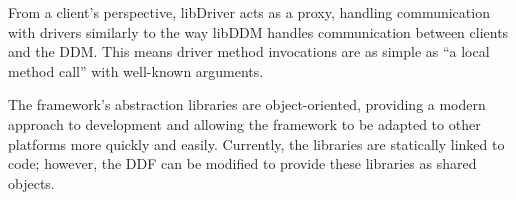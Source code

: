 From a client's perspective, libDriver acts as a proxy, handling communication
with drivers similarly to the way libDDM handles communication between clients
and the DDM.  This means driver method invocations are as simple as ``a local
method call'' with well-known arguments.

The framework's abstraction libraries are object-oriented, providing a modern
approach to development and allowing the framework to be adapted to other
platforms more quickly and easily.  Currently, the libraries are statically
linked to code; however, the DDF can be modified to provide these libraries
as shared objects.
